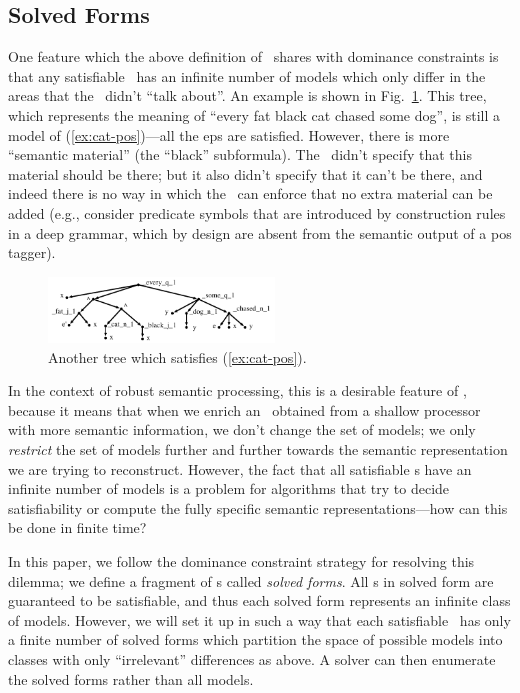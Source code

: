 \subsection{Solved Forms}

One feature which the above definition of \rmrs\ shares with dominance
constraints is that any satisfiable \rmrs\ has an infinite number of
models which only differ in the areas that the \rmrs\ didn't ``talk
about''.  An example is shown in Fig.~\ref{fig:fat-black-cat}.  This
tree, which represents the meaning of ``every fat black cat chased
some dog'', is still a model
of (\ref{ex:cat-pos})---all the {\sc ep}s are satisfied.  However, there is
more ``semantic material'' (the ``black'' subformula).  The \rmrs\
didn't specify that this material should be there; but it also didn't
specify that it can't be there, and indeed there is no way in which
the \rmrs\ can enforce that no extra material can be added (e.g.,
consider predicate symbols that are introduced by construction rules
in a deep grammar, which by design are absent from the semantic output
of a {\sc pos} tagger).


\begin{figure}
  \centering
  \includegraphics[width=6cm]{pic-more-stuff}
  \caption{Another tree which satisfies (\ref{ex:cat-pos}).}
  \label{fig:fat-black-cat}
\end{figure}


In the context of robust semantic processing, this is a desirable
feature of \rmrs, because it means that when we enrich an \rmrs\
obtained from a shallow processor with more semantic information, we
don't change the set of models; we only \emph{restrict} the set of
models further and further towards the semantic representation we are
trying to reconstruct.  However, the fact that all satisfiable \rmrs s
have an infinite number of models is a problem for algorithms that try
to decide satisfiability or compute the fully specific semantic
representations---how can this be done in finite time?

In this paper, we follow the dominance constraint strategy for
resolving this dilemma; we
define a fragment of \rmrs s called \emph{solved forms}.  All \rmrs
s in solved form are guaranteed to be satisfiable, and thus each
solved form represents an infinite class of models.  However, we will
set it up in such a way that each satisfiable \rmrs\ has only a finite
number of solved forms which partition the space of possible models
into classes with only ``irrelevant'' differences as above.  A solver
can then enumerate the solved forms rather than all models.

